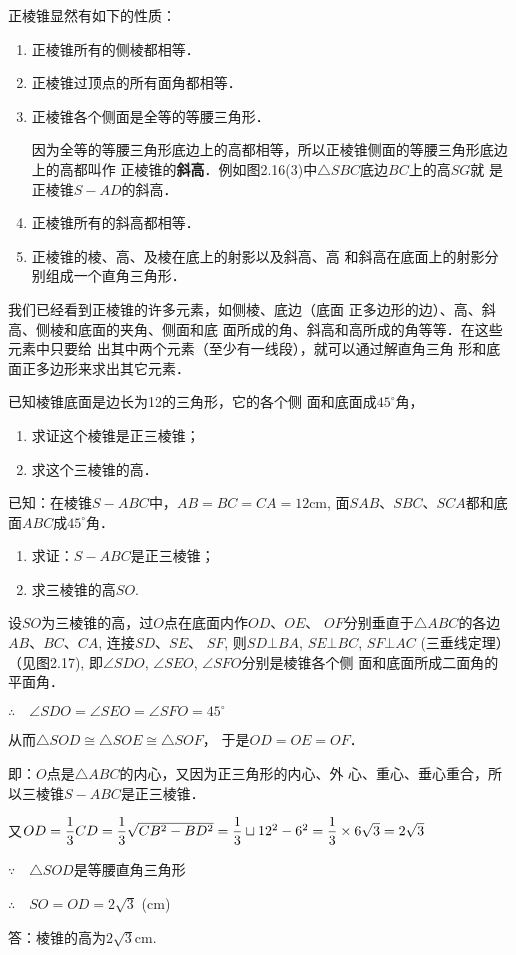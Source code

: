 正棱锥显然有如下的性质：
\begin{enumerate}
\item 正棱锥所有的侧棱都相等．
\item 正棱锥过顶点的所有面角都相等．
\item 正棱锥各个侧面是全等的等腰三角形．

因为全等的等腰三角形底边上的高都相等，所以正棱锥侧面的等腰三角形底边上的高都叫作
正棱锥的\textbf{斜高}．例如图2.16(3)中$\triangle SBC$底边$BC$上的高$SG$就
是正棱锥$S-AD$的斜高．
\item 正棱锥所有的斜高都相等．
\item 正棱锥的棱、高、及棱在底上的射影以及斜高、高
和斜高在底面上的射影分别组成一个直角三角形．
\end{enumerate}

我们已经看到正棱锥的许多元素，如侧棱、底边（底面
正多边形的边）、高、斜高、侧棱和底面的夹角、侧面和底
面所成的角、斜高和高所成的角等等．在这些元素中只要给
出其中两个元素（至少有一线段），就可以通过解直角三角
形和底面正多边形来求出其它元素．

\begin{example}
已知棱锥底面是边长为12的三角形，它的各个侧
面和底面成$45^{\circ}$角，
\begin{enumerate}
    \item 求证这个棱锥是正三棱锥；
    \item 求这个三棱锥的高．
\end{enumerate}

已知：在棱锥$S-ABC$中，$AB=BC=CA=12$cm, 
面$SAB$、$SBC$、$SCA$都和底面$ABC$成$45^{\circ}$角．
\begin{enumerate}
    \item 求证：$S-ABC$是正三棱锥；
    \item 求三棱锥的高$SO$.
\end{enumerate}
\end{example}

\begin{solution}
    设$SO$为三棱锥的高，过$O$点在底面内作$OD$、$OE$、
$OF$分别垂直于$\triangle ABC$的各边$AB$、$BC$、$CA$, 连接$SD$、$SE$、
$SF$, 则$SD\bot BA$, $SE\bot BC$, $SF\bot AC$ (三垂线定理）（见图2.17), 即$\angle SDO$, $\angle SEO$, $\angle SFO$分别是棱锥各个侧
面和底面所成二面角的平面角．

$\therefore\quad \angle SDO=\angle SEO=\angle SFO=45^{\circ}$

从而$\triangle SOD\cong \triangle SOE\cong \triangle SOF$，
于是$OD=OE=OF$．

即：$O$点是$\triangle ABC$的内心，又因为正三角形的内心、外
心、重心、垂心重合，所以三棱锥$S-ABC$是正三棱锥．

又$OD=\dfrac{1}{3}CD=\dfrac{1}{3}\sqrt{CB^2-BD^2}=\dfrac{1}{3}\sqcup12^2-6^2=\dfrac{1}{3}\times 6\sqrt{3}=2\sqrt{3}$

$\because\quad \triangle SOD$是等腰直角三角形

$\therefore\quad SO=OD=2\sqrt{3}$ (cm)

答：棱锥的高为$2\sqrt{3}$cm.
\end{solution}


